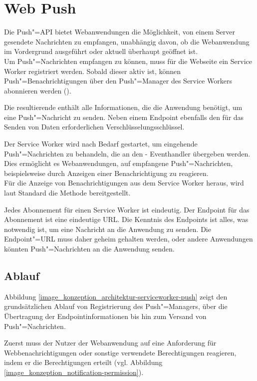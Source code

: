 \newpage
\section{Web Push}
\label{subsubsec_konzeption_serviceworker_push-api}

Die Push"=API bietet Webanwendungen die Möglichkeit, von einem Server gesendete Nachrichten zu empfangen, unabhängig davon, ob die Webanwendung im Vordergrund ausgeführt oder aktuell überhaupt geöffnet ist. \\
Um Push"=Nachrichten empfangen zu können, muss für die Webseite ein Service Worker registriert werden. Sobald dieser aktiv ist, können Push"=Benachrichtigungen über den Push"=Manager des Service Workers abonnieren werden ().

Die resultierende  enthält alle Informationen, die die Anwendung benötigt, um eine Push"=Nachricht zu senden. Neben einem Endpoint ebenfalls den für das Senden von Daten erforderlichen Verschlüsselungsschlüssel.

Der Service Worker wird nach Bedarf gestartet, um eingehende Push"=Nachrichten zu behandeln, die an den - Eventhandler übergeben werden. Dies ermöglicht es Webanwendungen, auf empfangene Push"=Nachrichten, beispielsweise durch Anzeigen einer Benachrichtigung zu reagieren. \\
Für die Anzeige von Benachrichtigungen aus dem Service Worker heraus, wird laut Standard die Methode  bereitgestellt.

Jedes Abonnement für einen Service Worker ist eindeutig. Der Endpoint für das Abonnement ist eine eindeutige URL. Die Kenntnis des Endpoints ist alles, was notwendig ist, um eine Nachricht an die Anwendung zu senden. Die Endpoint"=URL muss daher geheim gehalten werden, oder andere Anwendungen könnten Push"=Nachrichten an die Anwendung senden.

\subsection{Ablauf}

Abbildung \ref{image_konzeption_architektur-serviceworker-push} zeigt den grundsätzlichen Ablauf von Registrierung des Push"=Managers, über die Übertragung der Endpointinformationen bis hin zum Versand von Push"=Nachrichten. 

Zuerst  muss der Nutzer der Webanwendung auf eine Anforderung für Webbenachrichtigungen oder sonstige verwendete Berechtigungen reagieren, indem er die Berechtigungen erteilt (vgl. Abbildung \ref{image_konzeption_notification-permission}). \\

